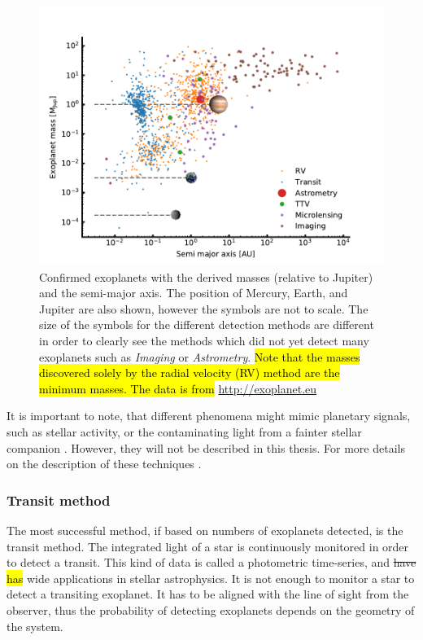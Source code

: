\begin{figure}[htpb!]
    \centering
    \includegraphics[width=1.0\linewidth]{figures/exoplanetDetectionType.pdf}
    \caption{Confirmed exoplanets with the derived masses (relative to Jupiter) and the semi-major
             axis. The position of Mercury, Earth, and Jupiter are also shown, however the symbols
             are not to scale. The size of the symbols for the different detection methods are
             different in order to clearly see the methods which did not yet detect many exoplanets
             such as \emph{Imaging} or \emph{Astrometry}. \hl{Note that the masses discovered
             solely by the radial velocity (RV) method are the minimum masses. The data is from}
             \url{http://exoplanet.eu}}
    \label{fig:detectionTypes}
\end{figure}

It is important to note, that different phenomena might mimic planetary signals, such as stellar
activity, or the contaminating light from a fainter stellar companion \citep[see
e.g.][]{Queloz2001,Oshagh2013,Oshagh2014}. However, they will not be described in this thesis. For
more details on the description of these techniques \citet[see e.g][]{Seager2010}.


\subsubsection{Transit method}
\label{sec:transitMethod}

The most successful method, if based on numbers of exoplanets detected, is the transit method. The
integrated light of a star is continuously monitored in order to detect a transit. This kind of data
is called a photometric time-series, and \st{have} \hl{has} wide applications in stellar
astrophysics. It is not enough to monitor a star to detect a transiting exoplanet. It has to be
aligned with the line of sight from the observer, thus the probability of detecting exoplanets
depends on the geometry of the system.

